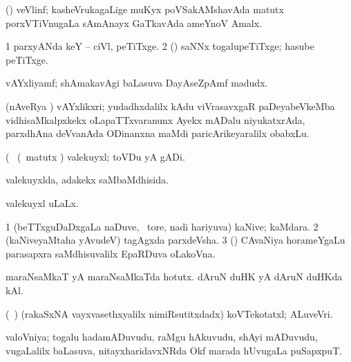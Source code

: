 \bentry
{} 
\gl{\nA}
\expl{}
\bmng
 (\jiVra) veVlinf; kasheVrukagaLige muKyx poVSakAMshavAda matutx porxVTiVnugaLa sAmAnayx GaTkavAda ameYnoV Amalx. 
\emng
\eentry

\bentry
{} 
\gl{\nA}
\expl{}
\bmng
\bnum
\num{1} parxyANda keY -- ciVl, peTiTxge. 
\num{2} (\ame) saNNx togalupeTiTxge; hasube peTiTxge. 
\enum
\emng
\eentry

\bentry
{} 
\gl{\nA}
\expl{(\P)}
\bmng
vAYxliyamf; shAmakavAgi baLasuva DayAseZpAmf madudx. 
\emng
\eentry

\bentry
{} 
\gl{\nA}
\expl{}
\bmng
 (nAveRya \pu) vAYxlikxri; yudadhxdalilx kAdu viVrasavxgaR paDeyabeVkeMba vidhisaMkalpxkekx oLapaTTxvaranunx Ayekx mADalu niyukatxrAda, parxdhAna deVvanAda ODinanxna  maMdi paricArikeyaralilx obabxLu. 
\emng
\eentry

\bentry
{} 
\gl{\nA}(\bava\ 
\bmng
(\aMrashA\ matutx \savi) valekuyxl; toVDu yA gADi. 
\emng
\eentry

\bentry
{} 
\gl{\gu}
\expl{}
\bmng
valekuyxlda, adakekx saMbaMdhisida. 
\emng
\eentry

\bentry
{} 
\gl{\gu}
\expl{}
\bmng
valekuyxl uLaLx. 
\emng
\eentry

\bentry
{} 
\gl{\nA}
\bmng
\bnum
\num{1} (beTTxguDaDxgaLa naDuve, \sA\ tore, nadi hariyuva) kaNive; kaMdara. 
\num{2} (kaNiveyaMtaha yAvudeV) tagAgxda parxdeVsha. 
\num{3} (\vAshi) CAvaNiya horameYgaLu parasapxra saMdhisuvalilx EpaRDuva oLakoVna. 
\enum
\emng

\noindent 
\gl{\pagu}
\expl{}
\bmng
\banum
{} maraNsaMkaT yA maraNsaMkaTda hotutx. 
 dAruN duHK yA dAruN duHKda kAl. 
\eanum
\emng
\eentry

\bentry 
{} 
\gl{\nA}
\expl{}
\bmng
 (\roV\ \pArxca) (rakaSxNA vayxvasethxyalilx nimiRsutitxdadx) koVTekotatxl; ALuveVri. 
\emng
\eentry

\bentry
{} 
\gl{\nA}
\expl{}
\bmng
 valoVniya; togalu hadamADuvudu, raMgu hAkuvudu, shAyi mADuvudu, \mo vugaLalilx baLasuva, nitayxharidavxNRda Okf marada hUvugaLa puSapxpuT. 
\emng
\eentry

\bentry
{} 
\gl{\nA}
\expl{}
\bmng
\emng
\eentry

